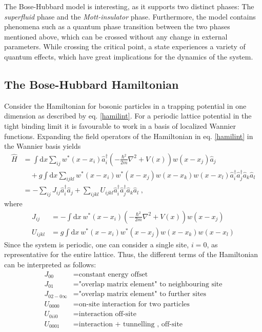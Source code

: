 The Bose-Hubbard model is interesting, as it supports two distinct phases: The \textit{superfluid} phase and the \textit{Mott-insulator} phase. Furthermore, the model contains phenomena such as a quantum phase transition between the two phases mentioned above, which can be crossed without any change in external parameters.
While crossing the critical point, a state experiences a variety of quantum effects, which have great implications for the dynamics of the system.


\subsection{The Bose-Hubbard Hamiltonian}
Consider the Hamiltonian for bosonic particles in a trapping potential in one dimension as described by eq. \eqref{hamilint}. For a periodic lattice potential in the tight binding limit it is favourable to work in a basis of localized Wannier functions. Expanding the field operators of the Hamiltonian in eq. \eqref{hamilint} in  the Wannier basis yields \cite{Jaksch}
\begin{align}
	\hat{H} &= \int \mathrm{d}x \sum_{i j} w^*(x-x_i) \hat{a}_{i}^{\dag} \left( - \frac{\hbar^2}{2 m} \nabla ^2 + V(x) \right) w(x-x_j) \hat{a}_j \nonumber \\
	& \quad + g \int \mathrm{d}x \sum_{i j k l} w^*(x-x_i) w^*(x-x_j) w(x-x_k) w(x-x_l) \hat{a}_{i}^{\dag} \hat{a}_{j}^{\dag} \hat{a}_{k} \hat{a}_{l} \\
	&= - \sum_{i j } J_{i j} \hat{a}_{i}^{\dag} \hat{a}_{j} + \sum_{i j k l} U_{i j k l} \hat{a}_{i}^{\dag} \hat{a}_{j}^{\dag} \hat{a}_{k} \hat{a}_{l} \; ,
\end{align}
where
\begin{align}
	J_{i j} &= - \int \mathrm{d}x \ w^*(x-x_i) \left( - \frac{\hbar^2}{2 m} \nabla ^2 + V(x) \right) w(x-x_j) \label{eq:BHparamJ} \\
	U_{i j k l} &= g \int \mathrm{d}x \ w^*(x-x_i) w^*(x-x_j) w(x-x_k) w(x-x_l) 
\end{align}
Since the system is periodic, one can consider a single site, $i = 0$, as representative for the entire lattice. Thus, the different terms of the Hamiltonian can be interpreted as follows:
\begin{align}
	J_{0 0} &= \text{constant energy offset} \nonumber \\
	J_{0 1} &= \text{"overlap matrix element" to neighbouring site} \nonumber \\
	J_{0 2 - 0 \infty} &= \text{"overlap matrix element" to further sites} \nonumber \\
	U_{0 0 0 0} &= \text{on-site interaction for two particles} \nonumber \\
	U_{0 i i 0} &= \text{interaction off-site} \nonumber \\
	U_{0 0 0 1} &= \text{interaction  + tunnelling , off-site} \nonumber 
\end{align}
